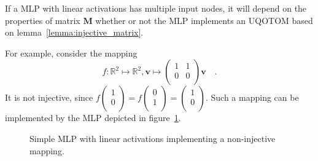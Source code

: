 \documentclass[../../main.tex]{subfiles}
\begin{document}
    \begin{remark}
        If a MLP with linear activations has multiple input nodes, it will depend on the properties of matrix $\bm{M}$ whether or not the MLP implements an UQOTOM based on lemma~\ref{lemma:injective_matrix}.

        For example, consider the mapping
        \[
            f: \mathbb{R}^2 \mapsto \mathbb{R}^2, \bm{v} \mapsto
            \begin{pmatrix*}
                1 & 1 \\
                0 & 0 \\
            \end{pmatrix*}
            \bm{v} \quad .
        \]
        It is not injective, since $f
        \begin{pmatrix*}
            1 \\
            0 \\
        \end{pmatrix*} = f
        \begin{pmatrix*}
            0 \\
            1 \\
        \end{pmatrix*}
        =
        \begin{pmatrix*}
            1 \\
            0 \\
        \end{pmatrix*}$. Such a mapping can be implemented by the MLP depicted in figure~\ref{fig:non_injective_linear_mlp}.

        \begin{figure}[h]
            \centering
            \label{fig:non_injective_linear_mlp}
            \caption{Simple MLP with linear activations implementing a non-injective mapping.}
        \end{figure}
    \end{remark}
\end{document}
